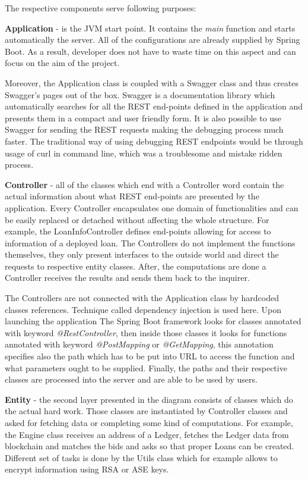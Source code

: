 \documentclass[a4paper,12pt,twoside,openany]{report}
\begin{document}
The respective components serve following purposes:

\textbf{Application} - is the JVM start point. It contains the \textit{main} function and starts automatically the server. All of the configurations are already supplied by Spring Boot. As a result, developer does not have to waste time on this aspect and can focus on the aim of the project. 

Moreover, the Application class is coupled with a Swagger class and thus creates Swagger's pages out of the box. Swagger is a documentation library which automatically searches for all the REST end-points defined in the application and presents them in a compact and user friendly form. It is also possible to use Swagger for sending the REST requests making the debugging process much faster. The traditional way of using debugging REST endpoints would be through usage of curl in command line, which was a troublesome and mistake ridden process.

\textbf{Controller} - all of the classes which end with a Controller word contain the actual information about what REST end-points are presented by the application. Every Controller encapsulates one domain of functionalities and can be easily replaced or detached without affecting the whole structure. For example, the LoanInfoController defines end-points allowing for access to information of a deployed loan. The Controllers do not implement the functions themselves, they only present interfaces to the outside world and direct the requests to respective entity classes. After, the computations are done a Controller receives the results and sends them back to the inquirer. 

The Controllers are not connected with the Application class by hardcoded classes references. Technique called dependency injection is used here. Upon launching the application The Spring Boot framework looks for classes annotated with keyword \textit{@RestController}, then inside those classes it looks for functions annotated with keyword \textit{@PostMapping} or \textit{@GetMapping}, this annotation specifies also the path which has to be put into URL to access the function and what parameters ought to be supplied. Finally, the paths and their respective classes are processed into the server and are able to be used by users.

\textbf{Entity} - the second layer presented in the diagram consists of classes which do the actual hard work. Those classes are instantiated by Controller classes and asked for fetching data or completing some kind of computations. For example, the Engine class receives an address of a Ledger, fetches the Ledger data from blockchain and matches the bids and asks so that proper Loans can be created. Different set of tasks is done by the Utils class which for example allows to encrypt information using RSA or ASE keys.
\end{document}
